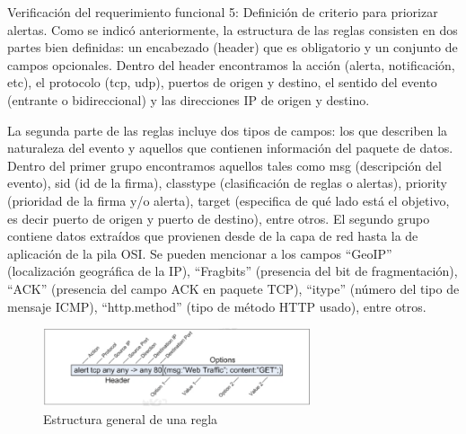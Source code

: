     \begin{section}{Verificación del requerimiento funcional 5: Definición de criterio para priorizar alertas.}
    Como se indicó anteriormente, la estructura de las reglas consisten en dos partes bien definidas: un encabezado (header) que es obligatorio  y un conjunto de campos opcionales. Dentro del header encontramos la acción (alerta, notificación, etc), el protocolo (tcp, udp), puertos de origen y destino, el sentido del evento (entrante o bidireccional) y las direcciones IP de origen y destino. \par
    La segunda parte de las reglas incluye dos tipos de campos: los que describen la naturaleza del evento y aquellos que contienen información del paquete de datos. Dentro del primer grupo encontramos aquellos tales como msg (descripción del evento), sid (id de la firma), classtype (clasificación de reglas o alertas), priority (prioridad de la firma y/o alerta), target (especifica de qué lado está el objetivo, es decir puerto de origen y puerto de destino), entre otros. El segundo grupo contiene datos extraídos que provienen desde de la capa de red hasta la de aplicación de la pila OSI. Se pueden mencionar a los campos “GeoIP” (localización geográfica de la IP), “Fragbits” (presencia del bit de fragmentación), “ACK” (presencia del campo ACK en paquete TCP), “itype” (número del tipo de mensaje ICMP), “http.method” (tipo de método HTTP usado), entre otros.
    \begin{figure}[H]
        \centering
        \includegraphics[width=0.7\textwidth]{./iteracion_3_imagenes/figura_41_estructura_regla.png}
        \caption{Estructura general de una regla}
        \label{fig:figura_41_estruc_regla}
    \end{figure}
    

\end{section}
